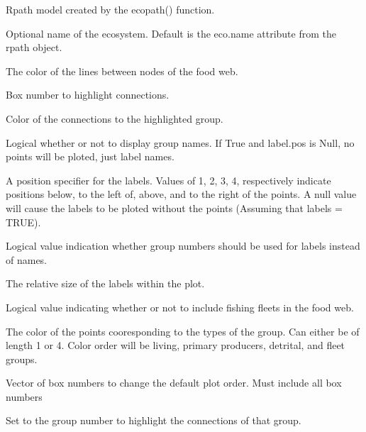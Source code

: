 \documentclass[a4paper]{book}
\begin{document}
\begin{Arguments}
\begin{ldescription}
\item[\code{Rpath.obj}] Rpath model created by the ecopath() function.

\item[\code{eco.name}] Optional name of the ecosystem.  Default is the eco.name attribute from the
rpath object.

\item[\code{line.col}] The color of the lines between nodes of the food web.

\item[\code{highlight}] Box number to highlight connections.

\item[\code{highlight.col}] Color of the connections to the highlighted group.

\item[\code{labels}] Logical whether or not to display group names.  If True and label.pos is Null, no
points will be ploted, just label names.

\item[\code{label.pos}] A position specifier for the labels.  Values of 1, 2, 3, 4, respectively
indicate positions below, to the left of, above, and to the right of the points. A null
value will cause the labels to be ploted without the points (Assuming that labels = TRUE).

\item[\code{label.num}] Logical value indication whether group numbers should be used for labels
instead of names.

\item[\code{label.cex}] The relative size of the labels within the plot.

\item[\code{fleets}] Logical value indicating whether or not to include fishing fleets in the food web.

\item[\code{type.col}] The color of the points cooresponding to the types of the group.  Can either be
of length 1 or 4.  Color order will be living, primary producers, detrital, and fleet groups.

\item[\code{box.order}] Vector of box numbers to change the default plot order.  Must include all box numbers

\item[\code{highlight}] Set to the group number to highlight the connections of that group.
\end{ldescription}
\end{Arguments}
\end{document}
